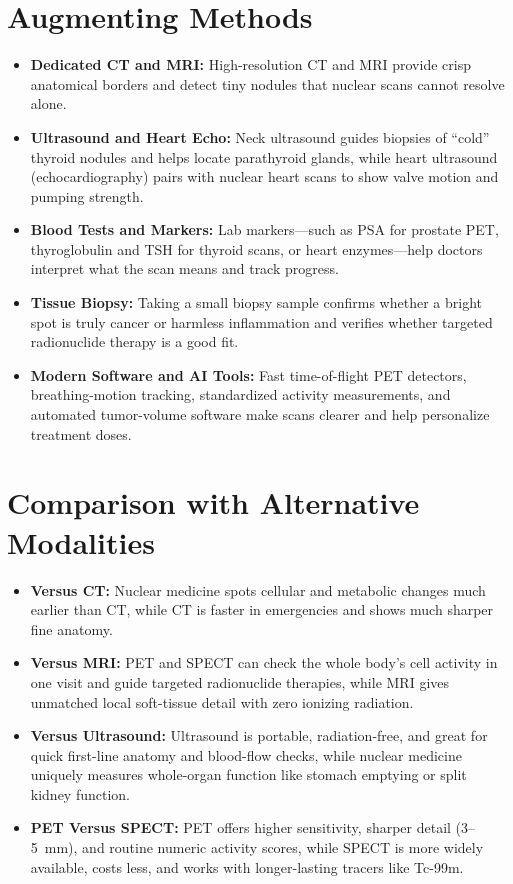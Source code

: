 \section{Augmenting Methods}
\begin{itemize}
  \item \textbf{Dedicated CT and MRI:} High-resolution CT and MRI provide crisp anatomical borders and detect tiny nodules that nuclear scans cannot resolve alone.
  \item \textbf{Ultrasound and Heart Echo:} Neck ultrasound guides biopsies of ``cold'' thyroid nodules and helps locate parathyroid glands, while heart ultrasound (echocardiography) pairs with nuclear heart scans to show valve motion and pumping strength.
  \item \textbf{Blood Tests and Markers:} Lab markers---such as PSA for prostate PET, thyroglobulin and TSH for thyroid scans, or heart enzymes---help doctors interpret what the scan means and track progress.
  \item \textbf{Tissue Biopsy:} Taking a small biopsy sample confirms whether a bright spot is truly cancer or harmless inflammation and verifies whether targeted radionuclide therapy is a good fit.
  \item \textbf{Modern Software and AI Tools:} Fast time-of-flight PET detectors, breathing-motion tracking, standardized activity measurements, and automated tumor-volume software make scans clearer and help personalize treatment doses.
\end{itemize}

\section{Comparison with Alternative Modalities}
\begin{itemize}
  \item \textbf{Versus CT:} Nuclear medicine spots cellular and metabolic changes much earlier than CT, while CT is faster in emergencies and shows much sharper fine anatomy.
  \item \textbf{Versus MRI:} PET and SPECT can check the whole body's cell activity in one visit and guide targeted radionuclide therapies, while MRI gives unmatched local soft-tissue detail with zero ionizing radiation.
  \item \textbf{Versus Ultrasound:} Ultrasound is portable, radiation-free, and great for quick first-line anatomy and blood-flow checks, while nuclear medicine uniquely measures whole-organ function like stomach emptying or split kidney function.
  \item \textbf{PET Versus SPECT:} PET offers higher sensitivity, sharper detail (3--5~mm), and routine numeric activity scores, while SPECT is more widely available, costs less, and works with longer-lasting tracers like Tc-99m.
\end{itemize}

